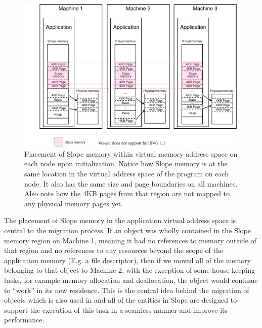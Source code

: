 \begin{figure}[t]
\centering
{}
\includegraphics[width=1\textwidth]{local-memory-management-phys-log.drawio}
\caption{
    Placement of Slope memory within virtual memory address space on each node
    upon initialization.
    Notice how Slope memory is at the same location in the virtual address
    space of the program on each node. It also has the same size and
    page boundaries on all machines. Also note how
    the 4KB pages from that region are not mapped to any physical memory pages
    yet.
}
\label{fig:localmemorymanagementphyslog}
\end{figure}

The placement of Slope memory in the application virtual address space is
central to the migration process.  If an object was wholly contained
in the Slope memory region on Machine 1, meaning it had no references to memory
outside
of that region and no references to any resources beyond the
scope of the application memory (E.g. a file descriptor), then if we moved all
of the memory belonging to that object to Machine 2, with the exception of
some house keeping tasks, for example memory allocation and deallocation, the
object would continue to ``work'' in its new residence.
This is the central
idea behind the migration of objects which is also used in \cite{memon2018ramp}
and all of the entities in Slope are designed
to support the execution of this task in a seamless manner and improve its
performance.

